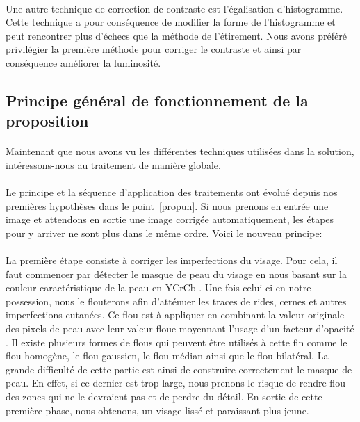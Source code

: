 \documentclass[11pt, french,screen]{report-rd-info}
\begin{document}
\paragraph*{}
Une autre technique de correction de contraste est l'égalisation d'histogramme. Cette technique a pour conséquence de modifier la forme de l'histogramme et peut rencontrer plus d'échecs que la méthode de l'étirement. Nous avons préféré privilégier la première méthode pour corriger le contraste et ainsi par conséquence améliorer la luminosité.

\subsection{Principe général de fonctionnement de la proposition}
\label{part:principegeneral}
\paragraph*{}
Maintenant que nous avons vu les différentes techniques utilisées dans la solution, intéressons-nous au traitement de manière globale.
\paragraph*{}
Le principe et la séquence d'application des traitements ont évolué depuis nos premières hypothèses dans le point~\ref{propun}. Si nous prenons en entrée une image et attendons en sortie une image corrigée automatiquement, les étapes pour y arriver ne sont plus dans le même ordre. Voici le nouveau principe:
\paragraph*{}
La première étape consiste à corriger les imperfections du visage. Pour cela, il faut commencer par détecter le masque de peau du visage en nous basant sur la couleur caractéristique de la peau en YCrCb \cite{Kukharev2004}. 
Une fois celui-ci en notre possession, nous le flouterons afin d'atténuer les traces de rides, cernes et autres imperfections cutanées. Ce flou est à appliquer en combinant la valeur originale des pixels de peau avec leur valeur floue moyennant l'usage d'un facteur d'opacité \cite{Lee}. Il existe plusieurs formes de flous qui peuvent être utilisés à cette fin comme le flou homogène, le flou gaussien, le flou médian ainsi que le flou bilatéral.
La grande difficulté de cette partie est ainsi de construire correctement le masque de peau. En effet, si ce dernier est trop large, nous prenons le risque de rendre flou des zones qui ne le devraient pas et de perdre du détail.
En sortie de cette première phase, nous obtenons, un visage lissé et paraissant plus jeune.
\end{document}
